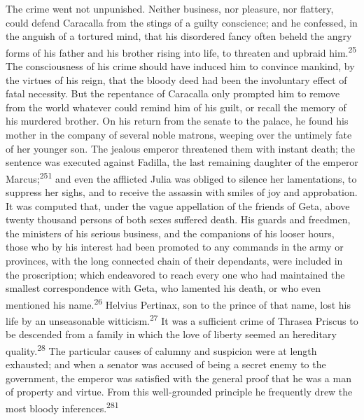 The crime went not unpunished. Neither business, nor pleasure,
nor flattery, could defend Caracalla from the stings of a guilty
conscience; and he confessed, in the anguish of a tortured mind,
that his disordered fancy often beheld the angry forms of his
father and his brother rising into life, to threaten and upbraid
him.\textsuperscript{25} The consciousness of his crime should have induced him to
convince mankind, by the virtues of his reign, that the bloody
deed had been the involuntary effect of fatal necessity. But the
repentance of Caracalla only prompted him to remove from the
world whatever could remind him of his guilt, or recall the
memory of his murdered brother. On his return from the senate to
the palace, he found his mother in the company of several noble
matrons, weeping over the untimely fate of her younger son. The
jealous emperor threatened them with instant death; the sentence
was executed against Fadilla, the last remaining daughter of the
emperor Marcus;\textsuperscript{251} and even the afflicted Julia was obliged to
silence her lamentations, to suppress her sighs, and to receive
the assassin with smiles of joy and approbation. It was computed
that, under the vague appellation of the friends of Geta, above
twenty thousand persons of both sexes suffered death. His guards
and freedmen, the ministers of his serious business, and the
companions of his looser hours, those who by his interest had
been promoted to any commands in the army or provinces, with the
long connected chain of their dependants, were included in the
proscription; which endeavored to reach every one who had
maintained the smallest correspondence with Geta, who lamented
his death, or who even mentioned his name.\textsuperscript{26} Helvius Pertinax,
son to the prince of that name, lost his life by an unseasonable
witticism.\textsuperscript{27} It was a sufficient crime of Thrasea Priscus to be
descended from a family in which the love of liberty seemed an
hereditary quality.\textsuperscript{28} The particular causes of calumny and
suspicion were at length exhausted; and when a senator was
accused of being a secret enemy to the government, the emperor
was satisfied with the general proof that he was a man of
property and virtue. From this well-grounded principle he
frequently drew the most bloody inferences.\textsuperscript{281}



